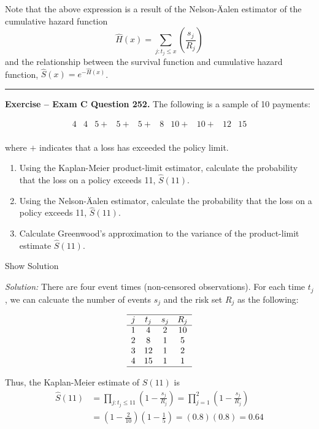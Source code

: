 \documentclass[]{book}
\providecommand{\tightlist}{%
  \setlength{\itemsep}{0pt}\setlength{\parskip}{0pt}}
\theoremstyle{definition}
\theoremstyle{definition}
\theoremstyle{definition}
\theoremstyle{remark}
\begin{document}
Note that the above expression is a result of the Nelson-Äalen estimator
of the cumulative hazard function
\[\hat{H}(x)=\sum_{j:t_j\leq x} \left( \frac{s_j}{R_j} \right)\] and the
relationship between the survival function and cumulative hazard
function, \(\hat{S}(x)=e^{-\hat{H}(x)}\).

\begin{center}\rule{0.5\linewidth}{\linethickness}\end{center}

\textbf{Exercise -- Exam C Question 252.} The following is a sample of
10 payments:

\[\begin{array}{cccccccccc}
4 &4 &5+ &5+ &5+ &8 &10+ &10+ &12 &15 \\
\end{array}\]

where \(+\) indicates that a loss has exceeded the policy limit.

\begin{enumerate}
\def\labelenumi{\alph{enumi})}
\tightlist
\item
  Using the Kaplan-Meier product-limit estimator, calculate the
  probability that the loss on a policy exceeds 11, \(\hat{S}(11)\).
\item
  Using the Nelson-Äalen estimator, calculate the probability that the
  loss on a policy exceeds 11, \(\hat{S}(11)\).
\item
  Calculate Greenwood's approximation to the variance of the
  product-limit estimate \(\hat{S}(11)\).
\end{enumerate}

Show Solution

\hypertarget{toggleExamC252}{}
\emph{Solution:} There are four event times (non-censored observations).
For each time \(t_j\), we can calcuate the number of events \(s_j\) and
the risk set \(R_j\) as the following:

\[\begin{array}{cccc}
\hline
j & t_j & s_j & R_j \\
\hline
1 & 4 & 2 & 10 \\
2 & 8 & 1 & 5 \\
3 & 12 & 1 & 2 \\
4 & 15 & 1 & 1 \\
\hline
\end{array}\]

Thus, the Kaplan-Meier estimate of \(S(11)\) is \[\begin{aligned}
\hat{S}(11) &= \prod_{j:t_j\leq 11} \left( 1- \frac{s_j}{R_j} \right) =  \prod_{j=1}^{2} \left( 1- \frac{s_j}{R_j} \right)\\
&= \left(1-\frac{2}{10} \right) \left(1-\frac{1}{5} \right) = (0.8)(0.8)= 0.64 \\
\end{aligned}\]
\end{document}
